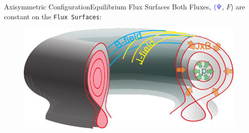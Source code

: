 \documentclass{beamer}
\begin{document}
\begin{frame}{Axisymmetric Configuration}{Equilibrium Flux Surfaces}
Both Fluxes, { $\color{blue} (\Psi$}, {\color{red} $F$}) are constant on the  \texttt{Flux Surfaces}:
	\begin{figure}[ht]
	\begin{center}
	\includegraphics[width=.8\columnwidth]{Tokamak_Equilibrium.jpg} %
	\end{center}
	\end{figure}
\end{frame}
\end{document}
